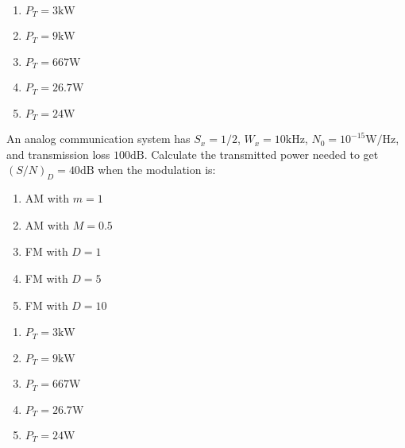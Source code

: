 \documentclass[es,boletin]{uah}
\begin{document}
{
	\begin{enumerate}
		\item $P_T= 3 \textrm{kW}$
  		\item $P_T= 9 \textrm{kW}$
    	\item $P_T= 667 \textrm{W}$
		\item $P_T= 26.7 \textrm{W}$
		\item $P_T= 24 \textrm{W}$
	\end{enumerate}
}{
	\cite{Carlson} An analog communication system has $S_x = 1/2$, $W_x = 10 \textrm{kHz}$, $N_0 = 10^{-15} \textrm{W/Hz}$, and transmission loss $100 \textrm{dB}$. Calculate the transmitted power needed to get $(S/N)_D = 40 \textrm{dB}$ when the modulation is:

	\begin{enumerate}
		\item AM with $m=1$
  		\item AM with $M=0.5$
    	\item FM with $D = 1$
		\item FM with $D = 5$
		\item FM with $D = 10$
	\end{enumerate}
}{
	\begin{enumerate}
		\item $P_T= 3 \textrm{kW}$
  		\item $P_T= 9 \textrm{kW}$
    	\item $P_T= 667 \textrm{W}$
		\item $P_T= 26.7 \textrm{W}$
		\item $P_T= 24 \textrm{W}$
	\end{enumerate}
}
\end{document}
